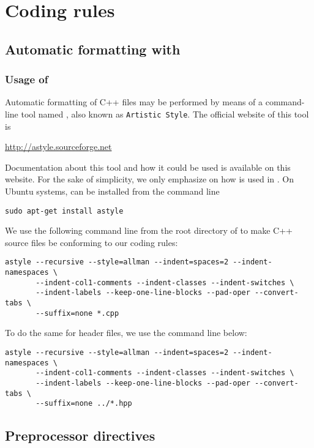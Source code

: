 


\chapter{Coding rules}


\section{Automatic formatting with \Astyle}

\subsection{Usage of \Astyle}

Automatic formatting of C++ files may be performed by means of a command-line tool named \Astyle, also known as \texttt{Artistic Style}. The official website of this tool is 
\begin{center}
\url{http://astyle.sourceforge.net}
\end{center}
Documentation about this tool and how it could be used is available on this website. For the sake of simplicity, we only emphasize on how \Astyle is used in \Simol. On Ubuntu systems, \Astyle can be installed from the command line
\begin{verbatim}
sudo apt-get install astyle
\end{verbatim}
We use the following command line from the root directory of \Simol to make C++ source files be conforming to our coding rules:
\begin{verbatim}
astyle --recursive --style=allman --indent=spaces=2 --indent-namespaces \
       --indent-col1-comments --indent-classes --indent-switches \
       --indent-labels --keep-one-line-blocks --pad-oper --convert-tabs \
       --suffix=none *.cpp
\end{verbatim}
To do the same for header files, we use the command line below:
\begin{verbatim}
astyle --recursive --style=allman --indent=spaces=2 --indent-namespaces \
       --indent-col1-comments --indent-classes --indent-switches \
       --indent-labels --keep-one-line-blocks --pad-oper --convert-tabs \
       --suffix=none ../*.hpp
\end{verbatim}



\section{Preprocessor directives}


